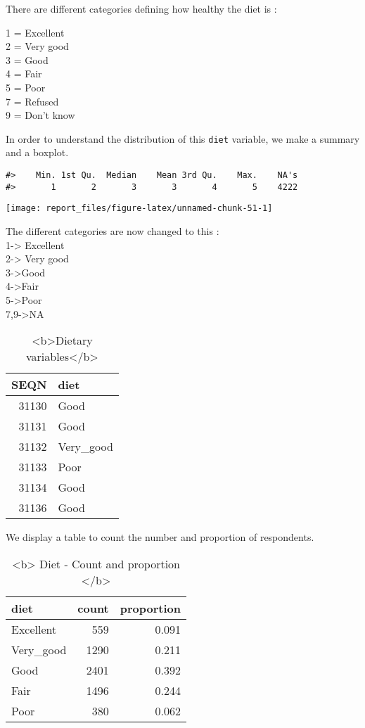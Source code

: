 \documentclass[
]{article}
\begin{document}
There are different categories defining how healthy the diet is :

1 = Excellent\\
2 = Very good\\
3 = Good\\
4 = Fair\\
5 = Poor\\
7 = Refused\\
9 = Don't know

In order to understand the distribution of this \texttt{diet} variable,
we make a summary and a boxplot.

\begin{verbatim}
#>    Min. 1st Qu.  Median    Mean 3rd Qu.    Max.    NA's 
#>       1       2       3       3       4       5    4222
\end{verbatim}

\begin{center}\texttt{[image: report\_files/figure-latex/unnamed-chunk-51-1]} \end{center}

The different categories are now changed to this :\\
1-\textgreater{} Excellent\\
2-\textgreater{} Very good\\
3-\textgreater Good\\
4-\textgreater Fair\\
5-\textgreater Poor\\
7,9-\textgreater NA

\begin{table}

\caption{\label{tab:unnamed-chunk-52}<b>Dietary variables</b>}
\centering
\begin{tabular}[t]{r|l}
\hline
SEQN & diet\\
\hline
31130 & Good\\
\hline
31131 & Good\\
\hline
31132 & Very\_good\\
\hline
31133 & Poor\\
\hline
31134 & Good\\
\hline
31136 & Good\\
\hline
\end{tabular}
\end{table}

We display a table to count the number and proportion of respondents.

\begin{table}

\caption{\label{tab:unnamed-chunk-53}<b> Diet - Count and proportion  </b>}
\centering
\begin{tabular}[t]{l|r|r}
\hline
diet & count & proportion\\
\hline
Excellent & 559 & 0.091\\
\hline
Very\_good & 1290 & 0.211\\
\hline
Good & 2401 & 0.392\\
\hline
Fair & 1496 & 0.244\\
\hline
Poor & 380 & 0.062\\
\hline
\end{tabular}
\end{table}
\end{document}
